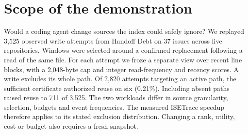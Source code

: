 \documentclass[conference]{IEEEtran}
\begin{document}
\section{Scope of the demonstration}
Would a coding agent change sources the index could safely ignore? We replayed 3,525 observed write attempts from Handoff Debt \cite{handoff} on 37 issues across five repositories. Windows were selected around a confirmed replacement following a read of the same file. For each attempt we froze a separate view over recent line blocks, with a 2,048-byte cap and integer read-frequency and recency scores. A write excludes its whole path. Of 2,820 attempts targeting an active path, the sufficient certificate authorized reuse on six (0.21\%). Including absent paths raised reuse to 711 of 3,525. The two workloads differ in source granularity, selection, budgets and event frequencies. The measured ISETrace speedup therefore applies to its stated exclusion distribution. Changing a rank, utility, cost or budget also requires a fresh snapshot.



\end{document}
